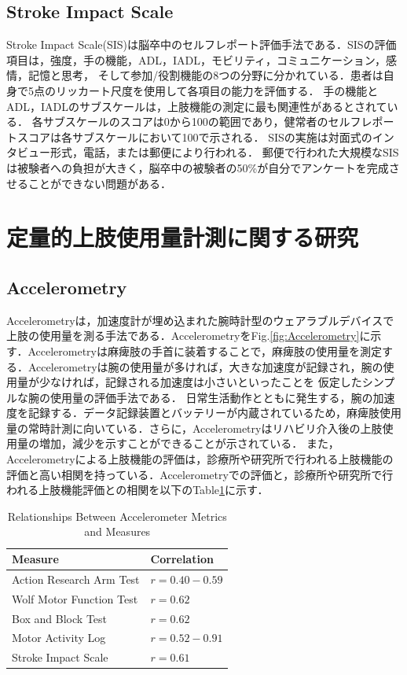 \subsection*{Stroke Impact Scale}
Stroke Impact Scale(SIS)\cite{Lin2010b,Lin2010a,Lai2002,Duncan2001,Duncan2002,Duncan2003}は脳卒中のセルフレポート評価手法である．SISの評価項目は，強度，手の機能，ADL，IADL，モビリティ，コミュニケーション，感情，記憶と思考，
そして参加/役割機能の8つの分野に分かれている．患者は自身で5点のリッカート尺度を使用して各項目の能力を評価する．
手の機能とADL，IADLのサブスケールは，上肢機能の測定に最も関連性があるとされている．
各サブスケールのスコアは0から100の範囲であり，健常者のセルフレポートスコアは各サブスケールにおいて100で示される．
SISの実施は対面式のインタビュー形式，電話，または郵便により行われる．
郵便で行われた大規模なSISは被験者への負担が大きく，脳卒中の被験者の50\%が自分でアンケートを完成させることができない問題がある．

\section{定量的上肢使用量計測に関する研究}
\subsection*{Accelerometry}
Accelerometryは，加速度計が埋め込まれた腕時計型のウェアラブルデバイスで上肢の使用量を測る手法である．Accelerometry\cite{Chen2005,Hayward2016,Dwiputra2017,VanDerPas2011,VanDerLee2004,Thrane2011,Seitz2011}をFig.\ref{fig:Accelerometry}に示す．Accelerometryは麻痺肢の手首に装着することで，麻痺肢の使用量を測定する．Accelerometryは腕の使用量が多ければ，大きな加速度が記録され，腕の使用量が少なければ，記録される加速度は小さいといったことを
仮定したシンプルな腕の使用量の評価手法である．
日常生活動作とともに発生する，腕の加速度を記録する．データ記録装置とバッテリーが内蔵されているため，麻痺肢使用量の常時計測に向いている\cite{VanDerPas2011}．さらに，Accelerometryはリハビリ介入後の上肢使用量の増加，減少を示すことができることが示されている\cite{Uswatte2006}．
また，Accelerometryによる上肢機能の評価は，診療所や研究所で行われる上肢機能の評価と高い相関を持っている．Accelerometryでの評価と，診療所や研究所で行われる上肢機能評価との相関を以下のTable\ref{table:measure}に示す．

\begin{table}[H]
  \caption{Relationships Between Accelerometer Metrics and Measures}
  \label{table:measure}
  \centering
  \begin{tabular}{ll}
    \hline
    Measure & Correlation\\
    \hline \hline
    Action Research Arm Test &$r = 0.40-0.59$\cite{Lang2007,Rand2012}\\
    Wolf Motor Function Test &$r = 0.62$\cite{Lang2007}\\
    Box and Block Test &$r = 0.62$\cite{Rand2012}\\
    Motor Activity Log &$r = 0.52-0.91$\cite{Uswatte2000,Uswatte2005,Uswatte2006}\\
    Stroke Impact Scale &$r = 0.61$\cite{Rand2012}\\
    \hline
  \end{tabular}
\end{table}

